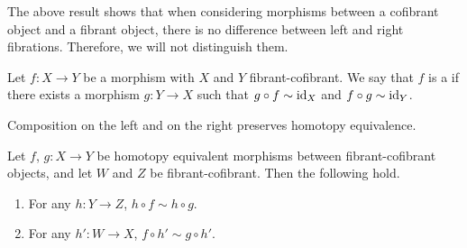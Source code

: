 \documentclass[main.tex]{subfiles}
\begin{document}
The above result shows that when considering morphisms between a cofibrant object and a fibrant object, there is no difference between left and right fibrations. Therefore, we will not distinguish them.

\begin{definition}
  \label{def:homotopy_equivalence_model_category}
  Let $f\colon X \to Y$ be a morphism with $X$ and $Y$ fibrant-cofibrant. We say that $f$ is a  if there exists a morphism $g\colon Y \to X$ such that $g \circ f \sim \mathrm{id}_{X}$ and $f \circ g \sim \mathrm{id}_{Y}$.
\end{definition}

Composition on the left and on the right preserves homotopy equivalence.
\begin{lemma}
  \label{lemma:composition_with_any_morphism_preserves_homotopy_equivalence}
  Let $f$, $g\colon X \to Y$ be homotopy equivalent morphisms between fibrant-cofibrant objects, and let $W$ and $Z$ be fibrant-cofibrant. Then the following hold.
  \begin{enumerate}
    \item For any $h\colon Y \to Z$, $h \circ f \sim h \circ g$.

    \item For any $h'\colon W \to X$, $f \circ h' \sim g \circ h'$.
  \end{enumerate}
\end{lemma}
\end{document}
